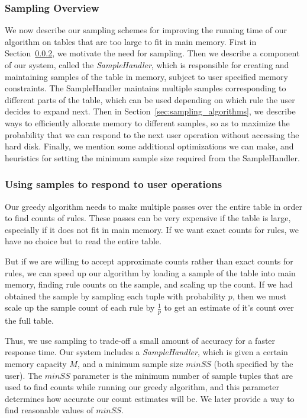 \subsubsection{Sampling Overview}
We now describe our sampling schemes for improving the running time of our algorithm on tables that are too large to fit in main memory. First in Section~\ref{sec:sample-using}, we motivate the need for sampling. Then we describe a component of our system, called the {\em SampleHandler}, which is responsible for creating and maintaining samples of the table in memory, subject to user specified memory constraints. The SampleHandler maintains multiple samples corresponding to different parts of the table, which can be used depending on which rule the user decides to expand next. Then in Section~\ref{sec:sampling_algorithms}, we describe ways to efficiently allocate memory to different samples, so as to maximize the probability that we can respond to the next user operation without accessing the hard disk. Finally, we mention some additional optimizations we can make, and heuristics for setting the minimum sample size required from the SampleHandler.

\subsubsection{Using samples to respond to user operations}\label{sec:sample-using}
Our greedy algorithm needs to make multiple passes over the entire table in order to find counts of rules. These passes can be very expensive if the table is large, especially if it does not fit in main memory. If we want exact counts for rules, we have no choice but to read the entire table. 

But if we are willing to accept approximate counts rather than exact counts for rules, we can speed up our algorithm by loading a sample of the table into main memory, finding rule counts on the sample, and scaling up the count. If we had obtained the sample by sampling each tuple with probability $p$, then we must scale up the sample count of each rule by $\frac{1}{p}$ to get an estimate of it's count over the full table.

Thus, we use sampling to trade-off a small amount of accuracy for a faster response time. Our system includes a {\em SampleHandler}, which is given a certain memory capacity $M$, and a minimum sample size $minSS$ (both specified by the user).
The $minSS$ parameter is the minimum number of sample tuples that are used to find counts while running our greedy algorithm, and this parameter determines how accurate our count estimates will be. We later provide a way to find reasonable values of $minSS$.

